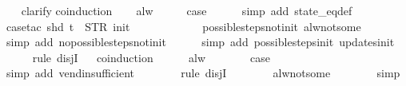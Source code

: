 \begin{isabellebody}
\ \ \isamarkupfalse%
\ clarify\isanewline
{}\isamarkupfalse%
{\isacharparenleft}coinduction{\isacharparenright}\isanewline
\ \ \isamarkupfalse%
\ alw\isanewline
\ \ \isamarkupfalse%
\ \isamarkupfalse%
\ {\isacharquery}case\isanewline
\ \ \ \ \isamarkupfalse%
\ {\isacharparenleft}simp\ add{\isacharcolon}\ state_eq{\isacharunderscore}def{\isacharparenright}\isanewline
\ \ \ \ \isamarkupfalse%
\ {\isacharparenleft}case{\isacharunderscore}tac\ {\isachardoublequoteopen}shd\ t\ {\isacharequal}\ {\isacharparenleft}STR\ {\isacharprime}{\isacharprime}init{\isacharprime}{\isacharprime}{\isacharcomma}\ {\isacharbrackleft}{\isacharbrackright}{\isacharparenright}{\isachardoublequoteclose}{\isacharparenright}\isanewline
\ \ \ \ \ \isamarkupfalse%
\isanewline
\ \ \ \ \isamarkupfalse%
\ possible{\isacharunderscore}steps{\isacharunderscore}not{\isacharunderscore}init\ alw{\isacharunderscore}not{\isacharunderscore}some\isanewline
\ \ \ \ \ \isamarkupfalse%
\ {\isacharparenleft}simp\ add{\isacharcolon}\ no{\isacharunderscore}possible{\isacharunderscore}steps{\isacharunderscore}not{\isacharunderscore}init{\isacharparenright}\isanewline
\ \ \ \ \isamarkupfalse%
\ {\isacharparenleft}simp\ add{\isacharcolon}\ possible{\isacharunderscore}steps{\isacharunderscore}init\ updates{\isacharunderscore}init{\isacharparenright}\isanewline
\ \ \ \ \isamarkupfalse%
\ {\isacharparenleft}rule\ disjI{}{\isacharparenright}\isanewline
\ \ \isamarkupfalse%
{\isacharparenleft}coinduction{\isacharparenright}\isanewline
\ \ \ \ \isamarkupfalse%
\ alw\isanewline
\ \ \ \ \isamarkupfalse%
\ \isamarkupfalse%
\ {\isacharquery}case\isanewline
\ \ \ \ \ \ \isamarkupfalse%
\ {\isacharparenleft}simp\ add{\isacharcolon}\ vend{\isacharunderscore}insufficient{\isacharparenright}\isanewline
\ \ \ \ \ \ \isamarkupfalse%
\ {\isacharparenleft}rule\ disjI{}{\isacharparenright}\isanewline
\ \ \ \ \ \ \isamarkupfalse%
\ alw{\isacharunderscore}not{\isacharunderscore}some\isanewline
\ \ \ \ \ \ \isamarkupfalse%
\ simp\isanewline
\ \ \isamarkupfalse%
\isanewline
{}\isamarkupfalse%
%
\endisatagproof
{\isafoldproof}%
%
\isadelimproof
%
\endisadelimproof
%
\end{isabellebody}
